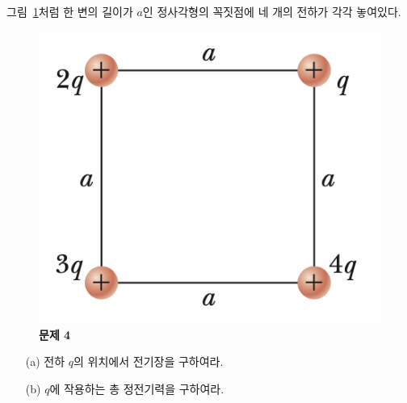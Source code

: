 \documentclass[tightenlines,floatfix,nofootinbib,superscriptaddress,fleqn]{revtex4}
\begin{document}
 그림~\ref{fig:2}처럼 한 변의 길이가
$a$인 정사각형의 꼭짓점에 네 개의 전하가 각각 놓여있다.
\begin{figure}[htp]
  \centering
  \includegraphics[scale=0.6]{qfig2-2.png}
  \caption{\textbf{문제 4}}
  \label{fig:2}
\end{figure}
\begin{itemize}
\item[(a)] 전하 $q$의 위치에서 전기장을 구하여라.
\item[(b)] $q$에 작용하는 총 정전기력을 구하여라.
\end{itemize}
\vspace{1.cm}
\end{document}
